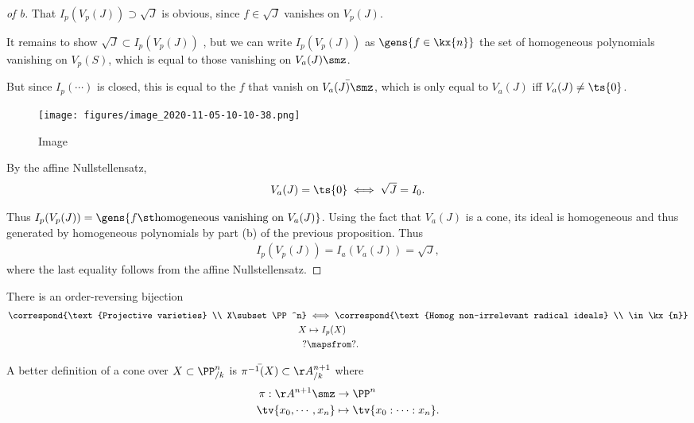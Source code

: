 \begin{proof}[of b]

That \(I_p(V_p(J)) \supset \sqrt J\) is obvious, since \(f\in \sqrt{J}\)
vanishes on \(V_p(J)\). 

It remains to show \(\sqrt{J} \subset I_p(V_p(J))\) , but we can write
\(I_p(V_p(J))\) as \(\gens{f \in \kx{n}}\) the set of homogeneous
polynomials vanishing on \(V_p(S)\), which is equal to those vanishing
on \(V_a(J) \smz\).

But since \(I_p(\cdots)\) is closed, this is equal to the \(f\) that
vanish on \(\bar{V_a(J)\smz}\), which is only equal to \(V_a(J)\) iff
\(V_a(J) \neq \ts{0}\).

\begin{figure}
\centering
\texttt{[image: figures/image\_2020-11-05-10-10-38.png]}
\caption{Image}
\end{figure}

By the affine Nullstellensatz,
\begin{align*}  
V_a(J) = \ts{0} \iff \sqrt{J} = I_0
.\end{align*}

Thus
\(I_p(V_p(J)) = \gens{f \st \text{homogeneous vanishing on }V_a(J)}\).
Using the fact that \(V_a(J)\) is a cone, its ideal is homogeneous and
thus generated by homogeneous polynomials by part (b) of the previous
proposition. Thus
\begin{align*}  
I_p(V_p(J)) = I_a(V_a(J)) = \sqrt J
,\end{align*} where the last equality follows from the affine
Nullstellensatz.

\end{proof}

\begin{corollary}[?]

There is an order-reversing bijection
\begin{align*}  
\correspond{\text{Projective varieties} \\ X\subset \PP^n}
&\iff
\correspond{\text{Homog non-irrelevant radical ideals} \\ \in \kx{n}} \\
X &\mapsto I_p(X) \\
? &\mapsfrom ?
.\end{align*}

\end{corollary}

\begin{remark}

A better definition of a cone over \(X\subset \PP^n_{/k}\) is
\(\bar{\pi^{-1}(X)} \subset \AA^{n+1}_{/k}\) where
\begin{align*}  
\pi: \AA^{n+1}\smz &\to \PP^n \\
\tv{x_0, \cdots, x_n} &\mapsto \tv{x_0: \cdots: x_n}
.\end{align*}

\end{remark}

